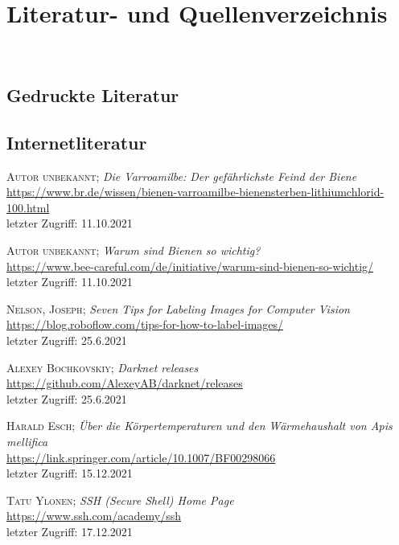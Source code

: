 \documentclass[11pt,a4paper]{article}
\newcommand{\bibLabel}[1]{\label{#1}\hypertarget{#1}{}}
\begin{document}
\section{Literatur- und Quellenverzeichnis}
\begin{thebibliography}
\\
\subsection{Gedruckte Literatur}

\subsection{Internetliteratur}
\setcounter{enumiv}{0}

\label{i1}
	\textsc{Autor unbekannt};
	\textit{Die Varroamilbe: Der gefährlichste Feind der Biene}\\
	\url{https://www.br.de/wissen/bienen-varroamilbe-bienensterben-lithiumchlorid-100.html}\\
	letzter Zugriff: 11.10.2021

\label{i2}
	\textsc{Autor unbekannt};
	\textit{Warum sind Bienen so wichtig?}\\
	\url{https://www.bee-careful.com/de/initiative/warum-sind-bienen-so-wichtig/}\\
	letzter Zugriff: 11.10.2021

 \bibLabel{annotate-tips}
	\textsc{Nelson, Joseph};
	\textit{Seven Tips for Labeling Images for Computer Vision}\\
	\url{https://blog.roboflow.com/tips-for-how-to-label-images/}\\
	letzter Zugriff: 25.6.2021

 \bibLabel{darknet-yolov4}
	\textsc{Alexey Bochkovskiy};
	\textit{Darknet releases}\\
	\url{https://github.com/AlexeyAB/darknet/releases}\\
	letzter Zugriff: 25.6.2021

 \bibLabel{wechselwarm}
    \textsc{Harald Esch};
    \textit{Über die Körpertemperaturen und den Wärmehaushalt von Apis mellifica}\\
    \url{https://link.springer.com/article/10.1007/BF00298066}\\
    letzter Zugriff: 15.12.2021

 \bibLabel{ssh}
    \textsc{Tatu Ylonen};
    \textit{SSH (Secure Shell) Home Page}\\
    \url{https://www.ssh.com/academy/ssh}\\
    letzter Zugriff: 17.12.2021
    

\end{thebibliography}
\end{document}
